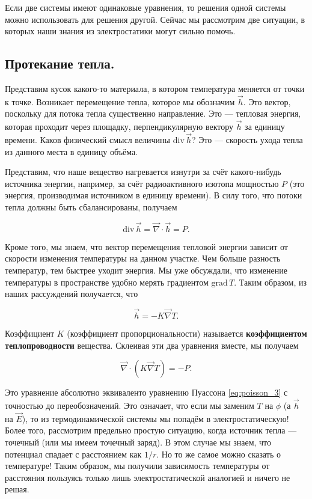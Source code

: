 \documentclass[11pt,a4paper]{article}
\numberwithin{equation}{section}
\newcommand{\grad}{\mathrm{grad}\,}
\renewcommand{\div}{\mathrm{div}\,}
\newcommand{\vn}{\vec{\nabla}}
\begin{document}
Если две системы имеют одинаковые уравнения, то решения одной
системы можно использовать для решения другой. Сейчас мы рассмотрим
две ситуации, в которых наши знания из электростатики могут сильно
помочь. 

\subsection{Протекание тепла.}
\label{sec:heat}

Представим кусок какого-то материала, в котором температура меняется
от точки к точке. Возникает перемещение тепла, которое мы обозначим
$\vec{h}$. Это вектор, поскольку для потока тепла существенно
направление. Это --- тепловая энергия, которая проходит через
площадку, перпендикулярную вектору $\vec{h}$ за единицу времени. Каков
физический смысл величины $\div \vec{h}$? Это --- скорость ухода тепла
из данного места в единицу объёма. 

Представим, что наше вещество нагревается изнутри за счёт
какого-нибудь источника энергии, например, за счёт радиоактивного
изотопа мощностью $P$ (это энергия, производимая источником в единицу
времени). В силу того, что потоки тепла должны быть сбалансированы,
получаем 

\begin{equation}
  \label{eq:heat_1}
  \div \vec{h} = \vn \cdot \vec{h} = P.
\end{equation}

Кроме того, мы знаем, что вектор перемещения тепловой энергии зависит
от скорости изменения температуры на данном участке. Чем больше
разность температур, тем быстрее уходит энергия. Мы уже обсуждали, что
изменение температуры в пространстве удобно мерять градиентом $\grad
T$. Таким образом, из наших рассуждений получается, что 

\begin{equation}
  \label{eq:heat_2}
  \vec{h} = - K \vn T. 
\end{equation}

Коэффициент $K$ (коэффициент пропорциональности) называется
\textbf{коэффициентом теплопроводности} вещества. Склеивая эти два
уравнения вместе, мы получаем 

\begin{equation}
  \label{eq:heat_3}
  \vn \cdot (K \vn T) = -P.
\end{equation}

Это уравнение абсолютно эквиваленто уравнению Пуассона
\eqref{eq:poisson_3} с точностью до переобозначений. Это означает, что
если мы заменим $T$ на $\phi$ (а $\vec{h}$ на $\vec{E}$), то из
термодинамической системы мы попадём в электростатическую! Более того,
рассмотрим предельно простую ситуацию, когда источник тепла ---
точечный (или мы имеем точечный заряд). В этом случае мы знаем, что
потенциал спадает с расстоянием как $1/r$. Но то же самое можно
сказать о температуре! Таким образом, мы получили зависимость
температуры от расстояния пользуясь только лишь электростатической
аналогией и ничего не решая.
\end{document}
